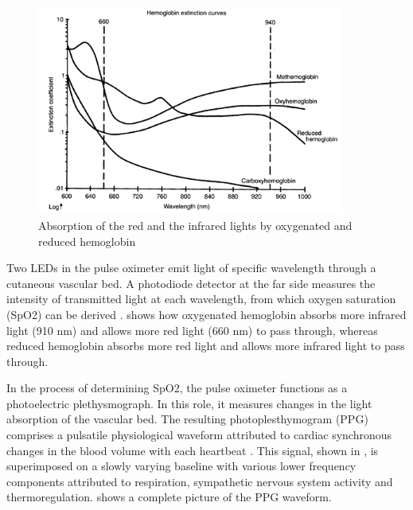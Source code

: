 \begin{figure}[!ht]
\centering
\includegraphics[width=0.9\textwidth]{images/hemoglobin.png}
\caption{Absorption of the red and the infrared lights by oxygenated and reduced hemoglobin}
\label{fig:hemoglobin}
\end{figure}



Two LEDs in the pulse oximeter emit light of specific wavelength
through a cutaneous vascular bed. A photodiode detector at the far
side measures the intensity of transmitted light at each wavelength,
from which oxygen saturation (SpO2) can be
derived \cite{bagha2011real}.  shows how oxygenated
hemoglobin absorbs more infrared light (910 nm) and allows more red
light (660 nm) to pass through, whereas reduced hemoglobin absorbs
more red light and allows more infrared light to pass through.


In the process of determining SpO2, the pulse oximeter functions as a
photoelectric plethysmograph. In this role, it measures changes in the
light absorption of the vascular bed. The resulting photoplesthymogram
(PPG) comprises a pulsatile physiological waveform attributed to
cardiac synchronous changes in the blood volume with each
heartbeat \cite{allen2007photoplethysmography}. This signal, shown
in , is superimposed on a slowly varying
baseline with various lower frequency components attributed to
respiration, sympathetic nervous system activity and
thermoregulation.  shows a complete picture of the
PPG waveform.

